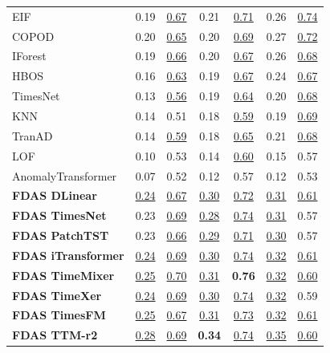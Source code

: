 \documentclass[border=2pt]{standalone}
\begin{document}
\begin{tabular}{l|cccccc}
EIF                    & 0.19 & \underline{0.67} & 0.21 & \underline{0.71} & 0.26 & \underline{0.74} \\
COPOD                  & 0.20 & \underline{0.65} & 0.20 & \underline{0.69} & 0.27 & \underline{0.72} \\
IForest                & 0.19 & \underline{0.66} & 0.20 & \underline{0.67} & 0.26 & \underline{0.68} \\
HBOS                   & 0.16 & \underline{0.63} & 0.19 & \underline{0.67} & 0.24 & \underline{0.67} \\
TimesNet               & 0.13 & \underline{0.56} & 0.19 & \underline{0.64} & 0.20 & \underline{0.68} \\
KNN                    & 0.14 & 0.51 & 0.18 & \underline{0.59} & 0.19 & \underline{0.69} \\
TranAD                 & 0.14 & \underline{0.59} & 0.18 & \underline{0.65} & 0.21 & \underline{0.68} \\
LOF                    & 0.10 & 0.53 & 0.14 & \underline{0.60} & 0.15 & 0.57 \\
AnomalyTransformer     & 0.07 & 0.52 & 0.12 & 0.57 & 0.12 & 0.53 \\
\midrule
\textbf{FDAS DLinear} & \underline{0.24} & \underline{0.67} & \underline{0.30} & \underline{0.72} & \underline{0.31} & \underline{0.61} \\
\textbf{FDAS TimesNet} & 0.23 & \underline{0.69} & \underline{0.28} & \underline{0.74} & \underline{0.31} & 0.57 \\
\textbf{FDAS PatchTST} & 0.23 & \underline{0.66} & \underline{0.29} & \underline{0.71} & \underline{0.30} & 0.57 \\
\textbf{FDAS iTransformer} & \underline{0.24} & \underline{0.69} & \underline{0.30} & \underline{0.74} & \underline{0.32} & \underline{0.61} \\
\textbf{FDAS TimeMixer} & \underline{0.25} & \underline{0.70} & \underline{0.31} & \textbf{0.76} & \underline{0.32} & \underline{0.60} \\
\textbf{FDAS TimeXer} & \underline{0.24} & \underline{0.69} & \underline{0.30} & \underline{0.74} & \underline{0.32} & 0.59 \\
\midrule
\textbf{FDAS TimesFM} & \underline{0.25} & \underline{0.67} & \underline{0.31} & \underline{0.73} & \underline{0.32} & \underline{0.61} \\
\textbf{FDAS TTM-r2} & \underline{0.28} & \underline{0.69} & \textbf{0.34} & \underline{0.74} & \underline{0.35} & \underline{0.60} \\
\bottomrule
\end{tabular}
\end{document}
